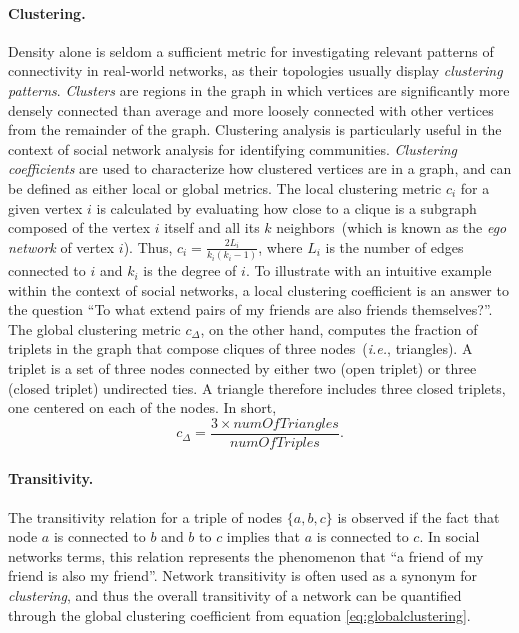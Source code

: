 \paragraph*{Clustering.}
Density alone is seldom a sufficient metric for investigating relevant patterns of connectivity in real-world networks, as their topologies usually display \textit{clustering patterns}.
\textit{Clusters} are regions in the graph in which vertices are significantly more densely connected than average and more loosely connected with other vertices from the remainder of the graph. 
Clustering analysis is particularly useful in the context of social network analysis for identifying communities.
%
\textit{Clustering coefficients} are used to characterize how clustered vertices are in a graph, and can be defined as either local or global metrics.
The local clustering metric $c_i$ for a given vertex $i$ is calculated by evaluating how close to a clique is a subgraph composed of the vertex $i$ itself and all its $k$ neighbors~(which is known as the \textit{ego network} of vertex $i$). Thus, $c_i = \frac{2L_i}{k_i(k_i - 1)}$, where $L_i$ is the number of edges connected to $i$ and $k_i$ is the degree of $i$.
To illustrate with an intuitive example within the context of social networks, a local clustering coefficient is an answer to the question ``To what extend pairs of my friends are also friends themselves?''.
%
The global clustering metric $c_{\Delta}$, on the other hand, computes the fraction of triplets in the graph that compose cliques of three nodes~(\textit{i.e.}, triangles). A triplet is a set of three nodes connected by either two (open triplet) or three (closed triplet) undirected ties. A triangle therefore includes three closed triplets, one centered on each of the nodes. In short, \begin{equation}\label{eq:globalclustering}
c_{\Delta} = \frac{3 \times numOfTriangles}{numOfTriples}.
\end{equation}



\paragraph*{Transitivity.}
The transitivity relation for a triple of nodes $\{a,b,c\}$ is observed if the fact that node $a$ is connected to $b$ and $b$ to $c$ implies that $a$ is connected to $c$.
In social networks terms, this relation represents the phenomenon that ``a friend of my friend is also my friend''.
Network transitivity is often used as a synonym for \textit{clustering}, and thus the overall transitivity of a network can be quantified through the global clustering coefficient from equation \ref{eq:globalclustering}.



